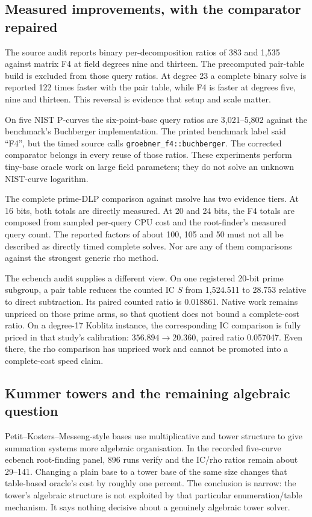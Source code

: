 \subsection{Measured improvements, with the comparator repaired}

The source audit reports binary per-decomposition ratios of 383 and
1,535 against matrix F4 at field degrees nine and thirteen. The
precomputed pair-table build is excluded from those query ratios. At
degree 23 a complete binary solve is reported 122 times faster with the
pair table, while F4 is faster at degrees five, nine and thirteen. This
reversal is evidence that setup and scale matter.

On five NIST P-curves the six-point-base query ratios are
3,021--5,802 against the benchmark's Buchberger implementation. The printed
benchmark label said ``F4'', but the timed source calls
\texttt{groebner\_f4::buchberger}. The corrected comparator belongs in
every reuse of those ratios. These experiments perform tiny-base oracle
work on large field parameters; they do not solve an unknown NIST-curve
logarithm.

The complete prime-DLP comparison against msolve has two evidence tiers.
At 16 bits, both totals are directly measured. At 20 and 24 bits, the F4
totals are composed from sampled per-query CPU cost and the root-finder's
measured query count. The reported factors of about 100, 105 and 50 must
not all be described as directly timed complete solves. Nor are any of
them comparisons against the strongest generic rho method.

The ecbench audit supplies a different view. On one registered 20-bit
prime subgroup, a pair table reduces the counted IC $S$ from 1,524.511 to
28.753 relative to direct subtraction. Its paired counted ratio is
0.018861. Native work remains unpriced on those prime arms, so that
quotient does not bound a complete-cost ratio. On a degree-17 Koblitz
instance, the corresponding IC comparison is fully priced in that
study's calibration: $356.894\to20.360$, paired ratio 0.057047. Even
there, the rho comparison has unpriced work and cannot be promoted into
a complete-cost speed claim.

\subsection{Kummer towers and the remaining algebraic question}

Petit--Kosters--Messeng-style bases use multiplicative and tower
structure to give summation systems more algebraic organisation.
\cite{pkm2016} In the recorded five-curve ecbench root-finding panel,
896 runs verify and the IC/rho ratios remain about 29--141. Changing a
plain base to a tower base of the same size changes that table-based
oracle's cost by roughly one percent. The conclusion is narrow: the
tower's algebraic structure is not exploited by that particular
enumeration/table mechanism. It says nothing decisive about a genuinely
algebraic tower solver.

